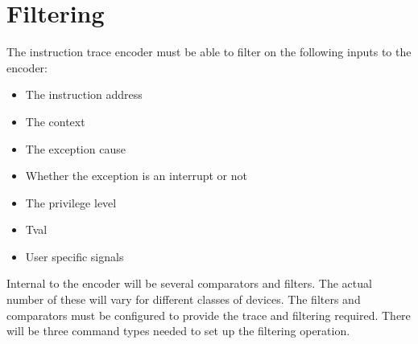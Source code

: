 \chapter{Filtering} \label{ch:filtering}


The instruction trace encoder must be able to filter on the following inputs to the encoder:

\begin{itemize}
  \item The instruction address 
  \item The context 
  \item The exception cause 
  \item Whether the exception is an interrupt or not 
  \item The privilege level
  \item Tval 
  \item User specific signals
\end{itemize}

Internal to the encoder will be several comparators and filters. The
actual number of these will vary for different classes of devices. The
filters and comparators must be configured to provide the trace and
filtering required. There will be three command types needed to set up
the filtering operation.

